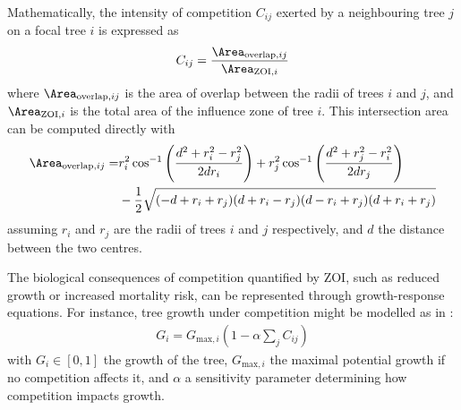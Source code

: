 
Mathematically, the intensity of competition $C_{ij}$ exerted by a neighbouring tree $j$ on a focal tree $i$ is expressed as
\begin{align}
    C_{ij} = \frac{ \Area_{\text{overlap}, ij} }{ \Area_{\text{ZOI}, i} }
\end{align}
where $\Area_{\text{overlap}, ij}$ is the area of overlap between the radii of trees $i$ and $j$, and $\Area_{\text{ZOI}, i}$ is the total area of the influence zone of tree $i$. This intersection area can be computed directly with
\begin{align}
    \Area_{\text{overlap}, ij} = &r_i^2 \cos^{-1}\left( \frac{d^2 + r_i^2 - r_j^2}{2 d r_i} \right) + r_j^2 \cos^{-1} \left(\frac{d^2 + r_j^2 - r_i^2}{2 d r_j} \right) \nonumber \\
    & - \frac{1}{2} \sqrt{(-d + r_i + r_j)(d + r_i - r_j)(d - r_i + r_j)(d + r_i + r_j)}
\end{align}
assuming $r_i$ and $r_j$ are the radii of trees $i$ and $j$ respectively, and $d$ the distance between the two centres.

The biological consequences of competition quantified by ZOI, such as reduced growth or increased mortality risk, can be represented through growth-response equations. For instance, tree growth under competition might be modelled as in \cite{Das2012,Uriarte2004}:
\begin{align}
    G_i = G_{\text{max}, i} \left(1 - \alpha \sum_{j} {C_{ij}} \right)
\end{align}
with $G_i \in [0, 1]$ the growth of the tree, $G_{\text{max}, i}$ the maximal potential growth if no competition affects it, and $\alpha$ a sensitivity parameter determining how competition impacts growth.

